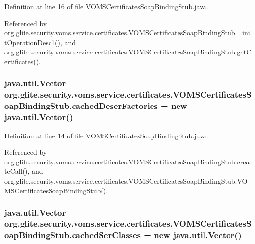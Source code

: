 Definition at line 16 of file VOMSCertificatesSoapBindingStub.java.



Referenced by org.glite.security.voms.service.certificates.VOMSCertificatesSoapBindingStub.\_\-initOperationDesc1(), and org.glite.security.voms.service.certificates.VOMSCertificatesSoapBindingStub.getCertificates().

\hypertarget{classorg_1_1glite_1_1security_1_1voms_1_1service_1_1certificates_1_1VOMSCertificatesSoapBindingStub_a3ee5954225532892b4843477390b55d4}{
\subsubsection[{cachedDeserFactories}]{\setlength{\rightskip}{0pt plus 5cm}java.util.Vector {\bf org.glite.security.voms.service.certificates.VOMSCertificatesSoapBindingStub.cachedDeserFactories} = new java.util.Vector()}}
\label{classorg_1_1glite_1_1security_1_1voms_1_1service_1_1certificates_1_1VOMSCertificatesSoapBindingStub_a3ee5954225532892b4843477390b55d4}


Definition at line 14 of file VOMSCertificatesSoapBindingStub.java.



Referenced by org.glite.security.voms.service.certificates.VOMSCertificatesSoapBindingStub.createCall(), and org.glite.security.voms.service.certificates.VOMSCertificatesSoapBindingStub.VOMSCertificatesSoapBindingStub().

\hypertarget{classorg_1_1glite_1_1security_1_1voms_1_1service_1_1certificates_1_1VOMSCertificatesSoapBindingStub_ae2308f8f6cf96c5cf5b9ac0c854d9114}{
\subsubsection[{cachedSerClasses}]{\setlength{\rightskip}{0pt plus 5cm}java.util.Vector {\bf org.glite.security.voms.service.certificates.VOMSCertificatesSoapBindingStub.cachedSerClasses} = new java.util.Vector()}}
\label{classorg_1_1glite_1_1security_1_1voms_1_1service_1_1certificates_1_1VOMSCertificatesSoapBindingStub_ae2308f8f6cf96c5cf5b9ac0c854d9114}


